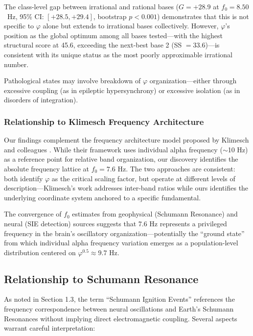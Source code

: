 \documentclass[11pt,a4paper]{article}
\newcommand{\phisym}{\varphi}
\begin{document}
The class-level gap between irrational and rational bases ($G = +28.9$ at $f_0 = 8.50$~Hz, 95\% CI: $[+28.5, +29.4]$, bootstrap $p < 0.001$) demonstrates that this is not specific to $\phisym$ alone but extends to irrational bases collectively. However, $\phisym$'s position as the global optimum among all bases tested---with the highest structural score at 45.6, exceeding the next-best base 2 (SS $= 33.6$)---is consistent with its unique status as the most poorly approximable irrational number.

Pathological states may involve breakdown of $\phisym$ organization---either through excessive coupling (as in epileptic hypersynchrony) or excessive isolation (as in disorders of integration).

\subsubsection{Relationship to Klimesch Frequency Architecture}

Our findings complement the frequency architecture model proposed by Klimesch and colleagues \parencite{pletzer2010golden, klimesch2013algorithm}. While their framework uses individual alpha frequency ($\sim$10 Hz) as a reference point for relative band organization, our discovery identifies the absolute frequency lattice at $f_0 = 7.6$ Hz. The two approaches are consistent: both identify $\phisym$ as the critical scaling factor, but operate at different levels of description---Klimesch's work addresses inter-band ratios while ours identifies the underlying coordinate system anchored to a specific fundamental.

The convergence of $f_0$ estimates from geophysical (Schumann Resonance) and neural (SIE detection) sources suggests that 7.6 Hz represents a privileged frequency in the brain's oscillatory organization---potentially the ``ground state'' from which individual alpha frequency variation emerges as a population-level distribution centered on $\phisym^{0.5} \approx 9.7$ Hz.

\subsection{Relationship to Schumann Resonance}

As noted in Section 1.3, the term ``Schumann Ignition Events'' references the frequency correspondence between neural oscillations and Earth's Schumann Resonances without implying direct electromagnetic coupling. Several aspects warrant careful interpretation:
\end{document}
